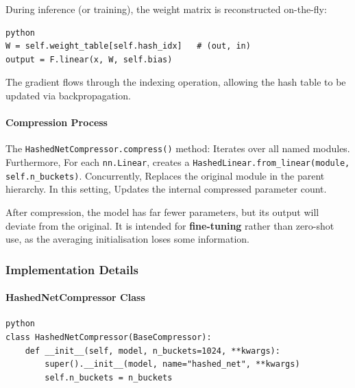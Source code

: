 During inference (or training), the weight matrix is reconstructed on-the-fly:

\vspace{0.5em}
\begin{mdframed}[backgroundcolor=codebg, linecolor=codeframe, linewidth=1pt, roundcorner=4pt, innerleftmargin=2pt, innerrightmargin=5pt, innertopmargin=5pt, innerbottommargin=5pt]
\begin{lstlisting}
python
W = self.weight_table[self.hash_idx]   # (out, in)
output = F.linear(x, W, self.bias)
\end{lstlisting}
\end{mdframed}
\vspace{0.5em}

The gradient flows through the indexing operation, allowing the hash table to be updated via backpropagation.

\paragraph{Compression Process}

The \texttt{HashedNetCompressor.compress()} method:
Iterates over all named modules. Furthermore, For each \texttt{nn.Linear}, creates a \texttt{HashedLinear.from\_linear(module, self.n\_buckets)}. Concurrently, Replaces the original module in the parent hierarchy. In this setting, Updates the internal compressed parameter count.


After compression, the model has far fewer parameters, but its output will deviate from the original. It is intended for \textbf{fine-tuning} rather than zero-shot use, as the averaging initialisation loses some information.


\subsubsection*{Implementation Details}

\paragraph{HashedNetCompressor Class}

\vspace{0.5em}
\begin{mdframed}[backgroundcolor=codebg, linecolor=codeframe, linewidth=1pt, roundcorner=4pt, innerleftmargin=2pt, innerrightmargin=5pt, innertopmargin=5pt, innerbottommargin=5pt]
\begin{lstlisting}
python
class HashedNetCompressor(BaseCompressor):
    def __init__(self, model, n_buckets=1024, **kwargs):
        super().__init__(model, name="hashed_net", **kwargs)
        self.n_buckets = n_buckets
\end{lstlisting}
\end{mdframed}
\vspace{0.5em}

